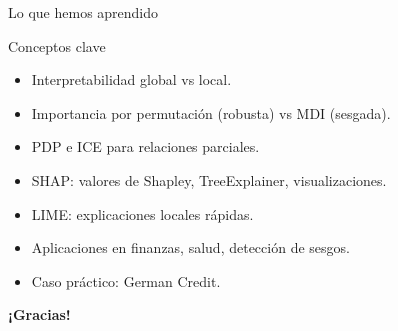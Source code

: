\documentclass[aspectratio=169, 10pt, xcolor=table]{beamer}
\begin{document}
\begin{frame}{Lo que hemos aprendido}
    \begin{exampleblock}{Conceptos clave}
        \begin{itemize}
            \item Interpretabilidad global vs local.
            \item Importancia por permutación (robusta) vs MDI (sesgada).
            \item PDP e ICE para relaciones parciales.
            \item SHAP: valores de Shapley, TreeExplainer, visualizaciones.
            \item LIME: explicaciones locales rápidas.
            \item Aplicaciones en finanzas, salud, detección de sesgos.
            \item Caso práctico: German Credit.
        \end{itemize}
    \end{exampleblock}
\end{frame}

\begin{frame}
    \centering
    \Huge \textbf{¡Gracias!}

\end{frame}
\end{document}
